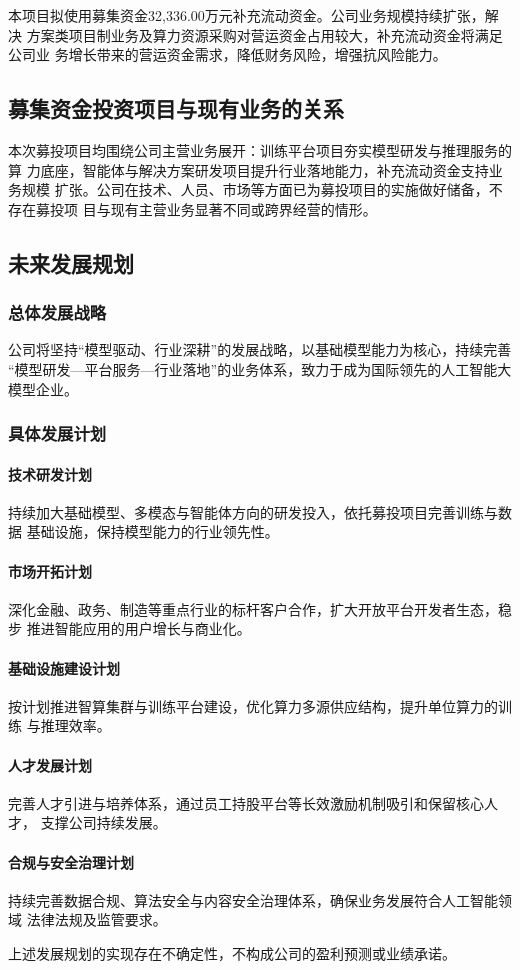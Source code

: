 本项目拟使用募集资金32,336.00万元补充流动资金。公司业务规模持续扩张，解决
方案类项目制业务及算力资源采购对营运资金占用较大，补充流动资金将满足公司业
务增长带来的营运资金需求，降低财务风险，增强抗风险能力。

\subsection{募集资金投资项目与现有业务的关系}

本次募投项目均围绕公司主营业务展开：训练平台项目夯实模型研发与推理服务的算
力底座，智能体与解决方案研发项目提升行业落地能力，补充流动资金支持业务规模
扩张。公司在技术、人员、市场等方面已为募投项目的实施做好储备，不存在募投项
目与现有主营业务显著不同或跨界经营的情形。

\subsection{未来发展规划}

\subsubsection{总体发展战略}

公司将坚持``模型驱动、行业深耕''的发展战略，以基础模型能力为核心，持续完善
``模型研发—平台服务—行业落地''的业务体系，致力于成为国际领先的人工智能大
模型企业。

\subsubsection{具体发展计划}

\paragraph{技术研发计划}
持续加大基础模型、多模态与智能体方向的研发投入，依托募投项目完善训练与数据
基础设施，保持模型能力的行业领先性。

\paragraph{市场开拓计划}
深化金融、政务、制造等重点行业的标杆客户合作，扩大开放平台开发者生态，稳步
推进智能应用的用户增长与商业化。

\paragraph{基础设施建设计划}
按计划推进智算集群与训练平台建设，优化算力多源供应结构，提升单位算力的训练
与推理效率。

\paragraph{人才发展计划}
完善人才引进与培养体系，通过员工持股平台等长效激励机制吸引和保留核心人才，
支撑公司持续发展。

\paragraph{合规与安全治理计划}
持续完善数据合规、算法安全与内容安全治理体系，确保业务发展符合人工智能领域
法律法规及监管要求。

上述发展规划的实现存在不确定性，不构成公司的盈利预测或业绩承诺。
